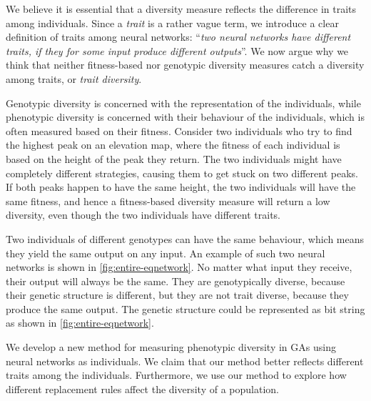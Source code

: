 We believe it is essential that a diversity measure reflects the difference in traits among individuals. Since a \emph{trait} is a rather vague term, we introduce a clear definition of traits among neural networks: ``\emph{two neural networks have different traits, if they for some input produce different outputs}''. We now argue why we think that neither fitness-based nor genotypic diversity measures catch a diversity among traits, or \emph{trait diversity}.

Genotypic diversity is concerned with the representation of the individuals, while phenotypic diversity is concerned with their behaviour of the individuals, which is often measured based on their fitness. Consider two individuals who try to find the highest peak on an elevation map, where the fitness of each individual is based on the height of the peak they return. The two individuals might have completely different strategies, causing them to get stuck on two different peaks. If both peaks happen to have the same height, the two individuals will have the same fitness, and hence a fitness-based diversity measure will return a low diversity, even though the two individuals have different traits.

Two individuals of different genotypes can have the same behaviour, which means they yield the same output on any input. An example of such two neural networks is shown in \cref{fig:entire-eqnetwork}. No matter what input they receive, their output will always be the same. They are genotypically diverse, because their genetic structure is different, but they are not trait diverse, because they produce the same output. The genetic structure could be represented as bit string as shown in \cref{fig:entire-eqnetwork}.
%

%
We develop a new method for measuring phenotypic diversity in GAs using neural networks as individuals. We claim that our method better reflects different traits among the individuals. Furthermore, we use our method to explore how different replacement rules affect the diversity of a population.

